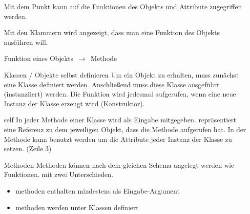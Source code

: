 \begin{frame}
	Mit dem Punkt  kann auf die Funktionen des Objekts und Attribute zugegriffen werden.
	
	Mit den Klammern wird angezeigt, dass man eine Funktion des Objekts ausführen will.
	
	\begin{center}
		\Large Funktion eines Objekts $\,\to\,$ \alert{Methode}
	\end{center}
\end{frame}
\begin{frame}{Klassen / Objekte selbst definieren}
	Um ein Objekt zu erhalten, muss zunächst eine Klasse definiert werden. Anschließend muss diese Klasse ausgeführt (instanziiert) werden. Die  Funktion wird jedesmal aufgerufen, wenn eine neue Instanz der Klasse erzeugt wird (Konstruktor).
	
	
\end{frame}
\begin{frame}{self}
	In jeder Methode einer Klasse wird  als Eingabe mitgegeben.  repräsentiert eine Referenz zu dem jeweiligen Objekt, dass die Methode aufgerufen hat.\linebreak
	In der  Methode kann  benutzt werden um die Attribute jeder Instanz der Klasse zu setzen. (Zeile 3)
	
	
\end{frame}
\begin{frame}{Methoden}
	Methoden können nach dem gleichen Schema angelegt werden wie Funktionen, mit zwei Unterschieden.
	\begin{itemize}
		\item methoden enthalten mindestens  als Eingabe-Argument
		
		\item methoden werden unter Klassen definiert
		
	
	\end{itemize}
\end{frame}
